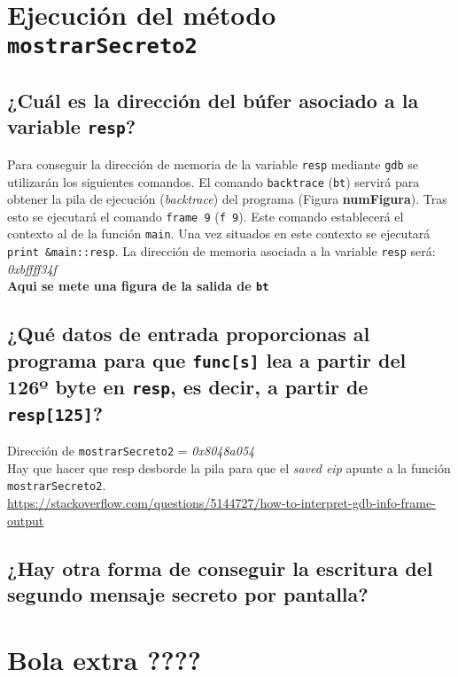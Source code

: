 \documentclass[10pt,a4paper]{article}
\begin{document}
\section{Ejecución del método \texttt{mostrarSecreto2}}

\subsection{¿Cuál es la dirección del búfer asociado a la variable \texttt{resp}?}

Para conseguir la dirección de memoria de la variable \texttt{resp} mediante \texttt{gdb} se utilizarán los siguientes comandos. El comando \texttt{backtrace} (\texttt{bt}) servirá para obtener la pila de ejecución (\emph{backtrace}) del programa (Figura \textbf{numFigura}). Tras esto se ejecutará el comando \texttt{frame 9} (\texttt{f 9}). Este comando establecerá el contexto al de la función \texttt{main}. Una vez situados en este contexto se ejecutará \texttt{print \&{}main::resp}. La dirección de memoria asociada a la variable \texttt{resp} será: \emph{0xbffff34f}\\

\textbf{Aqui se mete una figura de la salida de \texttt{bt}}\\


\subsection{¿Qué datos de entrada proporcionas al programa para que \texttt{func[s]} lea a partir del 126º byte en \texttt{resp}, es decir, a partir de \texttt{resp[125]}?}


Dirección de \texttt{mostrarSecreto2} = \emph{0x8048a054}\\
Hay que hacer que resp desborde la pila para que el \emph{saved eip} apunte a la función \texttt{mostrarSecreto2}. \\


\url{https://stackoverflow.com/questions/5144727/how-to-interpret-gdb-info-frame-output}


\subsection{¿Hay otra forma de conseguir la escritura del segundo mensaje secreto por pantalla?}


\section{Bola extra ????}
\end{document}
